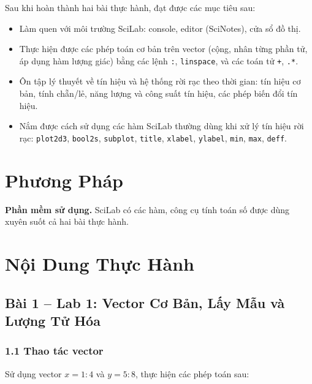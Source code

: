 \documentclass[12pt,a4paper]{article}
\begin{document}
Sau khi hoàn thành hai bài thực hành, đạt được các mục tiêu sau:

\begin{itemize}[leftmargin=1.2em]
  \item Làm quen với môi trường SciLab: console, editor (SciNotes), cửa sổ đồ thị.
  \item Thực hiện được các phép toán cơ bản trên vector (cộng, nhân từng phần tử,
  áp dụng hàm lượng giác) bằng các lệnh \texttt{:}, \texttt{linspace}, và các toán
  tử \texttt{+}, \texttt{.*}.
  \item Ôn tập lý thuyết về tín hiệu và hệ thống rời rạc theo thời gian: tín hiệu
  cơ bản, tính chẵn/lẻ, năng lượng và công suất tín hiệu, các phép biến đổi tín
  hiệu.
  \item Nắm được cách sử dụng các hàm SciLab thường dùng khi xử lý tín hiệu rời
  rạc: \texttt{plot2d3}, \texttt{bool2s}, \texttt{subplot}, \texttt{title},
  \texttt{xlabel}, \texttt{ylabel}, \texttt{min}, \texttt{max}, \texttt{deff}.
\end{itemize}

\section{Phương Pháp}

\textbf{Phần mềm sử dụng.} SciLab có các hàm, công cụ tính toán
số được dùng xuyên suốt cả hai bài thực hành.

\section{Nội Dung Thực Hành}

\subsection{Bài 1 -- Lab 1: Vector Cơ Bản, Lấy Mẫu và Lượng Tử Hóa}

\subsubsection*{1.1 Thao tác vector}

Sử dụng vector $x = 1{:}4$ và $y = 5{:}8$, thực hiện các phép toán sau:
\end{document}
